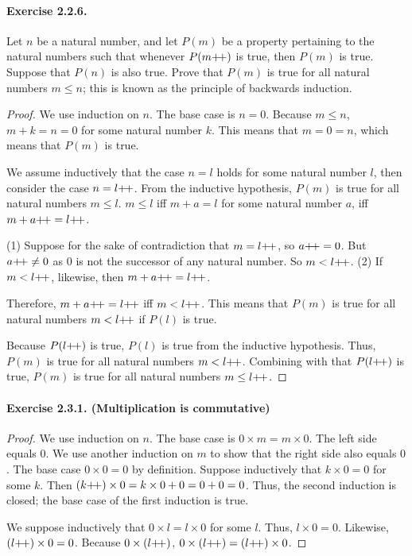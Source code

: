 \paragraph{Exercise 2.2.6.} Let $n$ be a natural number, and let $P(m)$ be a property pertaining to the natural numbers such that whenever $P (m{+}{\mkern-3mu}{+})$ is true, then $P (m)$ is true. Suppose that $P(n)$ is also true. Prove that $P(m)$ is true for all natural numbers $m \leq n$; this is known as the principle of backwards induction.
\begin{proof}
    We use induction on $n$. The base case is $n=0$. Because $m\leq n$, $m+k=n=0$ for some natural number $k$. This means that $m=0=n$, which means that $P(m)$ is true.

    We assume inductively that the case $n=l$ holds for some natural number $l$, then consider the case $n=l{+}{\mkern-3mu}{+}$. From the inductive hypothesis, $P(m)$ is true for all natural numbers $m\leq l$. $m\leq l$ iff $m+a=l$ for some natural number $a$, iff $m+a{+}{\mkern-3mu}{+}=l{+}{\mkern-3mu}{+}$. 

    (1) Suppose for the sake of contradiction that $m=l{+}{\mkern-3mu}{+}$, so $a{+}{\mkern-3mu}{+}=0$. But $a{+}{\mkern-3mu}{+} \neq 0$ as $0$ is not the successor of any natural number. So $m<l{+}{\mkern-3mu}{+}$. (2) If $m<l{+}{\mkern-3mu}{+}$, likewise, then $m+a{+}{\mkern-3mu}{+}=l{+}{\mkern-3mu}{+}$.

    Therefore, $m+a{+}{\mkern-3mu}{+}=l{+}{\mkern-3mu}{+}$ iff $m<l{+}{\mkern-3mu}{+}$. This means that $P(m)$ is true for all natural numbers $m<l{+}{\mkern-3mu}{+}$ if $P(l)$ is true. 

    Because $P(l{+}{\mkern-3mu}{+})$ is true, $P(l)$ is true from the inductive hypothesis. Thus, $P(m)$ is true for all natural numbers $m<l{+}{\mkern-3mu}{+}$. Combining with that $P(l{+}{\mkern-3mu}{+})$ is true, $P(m)$ is true for all natural numbers $m \leq l{+}{\mkern-3mu}{+}$.
\end{proof}

\paragraph{Exercise 2.3.1. (Multiplication is commutative)}
\begin{proof}
    We use induction on $n$. The base case is $0\times m=m\times 0$. The left side equals $0$. We use another induction on $m$ to show that the right side also equals $0$. The base case $0\times 0=0$ by definition. Suppose inductively that $k\times 0 =0$ for some $k$. Then $(k{+}{\mkern-3mu}{+})\times 0=k\times 0+0=0+0=0$. Thus, the second induction is closed; the base case of the first induction is true.

    We suppose inductively that $0\times l = l \times 0$ for some $l$. Thus, $l\times 0=0$. Likewise, $(l{+}{\mkern-3mu}{+})\times 0 = 0$. Because $0\times (l{+}{\mkern-3mu}{+})$, $0\times (l{+}{\mkern-3mu}{+}) = (l{+}{\mkern-3mu}{+}) \times 0$.
\end{proof}

